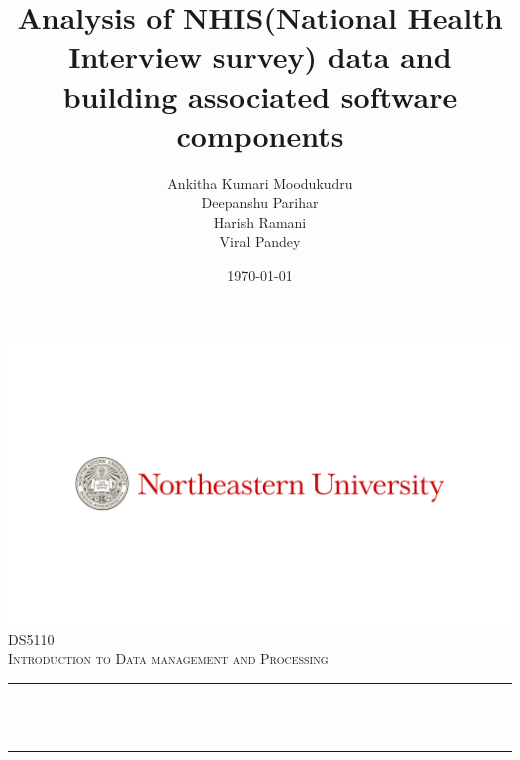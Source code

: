 \documentclass[12pt]{article}
\title{Analysis of NHIS(National Health Interview survey) data and building associated software components}
\author{Ankitha Kumari Moodukudru\\
Deepanshu Parihar\\
Harish Ramani\\
Viral Pandey}%
\date{\today}											%
\makeatletter
\let\thetitle\@title
\let\theauthor\@author
\makeatother
\begin{document}

\begin{titlepage}
	\centering
    
    \includegraphics[scale = 0.75]{logo.jpg}\\[1.0 cm]	%
   
	\textsc{\Large DS5110}\\[0.5 cm]				%
	\textsc{\large Introduction to Data management and Processing}\\[0.5 cm]				%
	\rule{\linewidth}{0.2 mm} \\[0.4 cm]
	{ \huge \bfseries \thetitle}\\
	\rule{\linewidth}{0.2 mm} \\[1.5 cm]
	
	\begin{minipage}{0.4\textwidth}
		\begin{flushleft} \large
		
			\theauthor
			\end{flushleft}
			\end{minipage}~
			\begin{minipage}{0.4\textwidth}
		
	\end{minipage}\\[2 cm]
	

 
	\vfill
	
\end{titlepage}


\tableofcontents
\pagebreak

\end{document}
